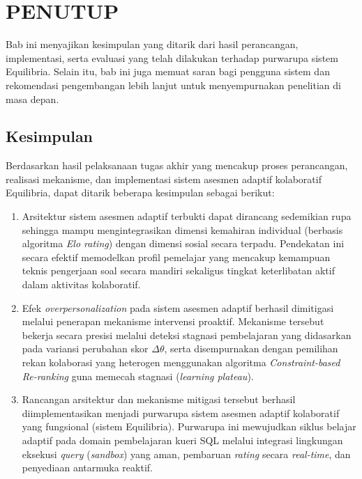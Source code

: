 \cleardoublepage
\chapter{PENUTUP}
\label{chap:penutup}

Bab ini menyajikan kesimpulan yang ditarik dari hasil perancangan, implementasi, serta evaluasi yang telah dilakukan terhadap purwarupa sistem Equilibria. Selain itu, bab ini juga memuat saran bagi pengguna sistem dan rekomendasi pengembangan lebih lanjut untuk menyempurnakan penelitian di masa depan.

\section{Kesimpulan}
\label{sec:kesimpulan}

Berdasarkan hasil pelaksanaan tugas akhir yang mencakup proses perancangan, realisasi
mekanisme, dan implementasi sistem asesmen adaptif kolaboratif Equilibria, dapat
ditarik beberapa kesimpulan sebagai berikut:
\begin{enumerate}
    \item Arsitektur sistem asesmen adaptif terbukti dapat dirancang sedemikian rupa sehingga mampu mengintegrasikan dimensi kemahiran individual (berbasis algoritma \textit{Elo rating}) dengan dimensi sosial secara terpadu. Pendekatan ini secara efektif memodelkan profil pemelajar yang mencakup kemampuan teknis pengerjaan soal secara mandiri sekaligus tingkat keterlibatan aktif dalam aktivitas kolaboratif.

    \item Efek \textit{overpersonalization} pada sistem asesmen adaptif berhasil dimitigasi melalui penerapan mekanisme intervensi proaktif. Mekanisme tersebut bekerja secara presisi melalui deteksi stagnasi pembelajaran yang didasarkan pada variansi perubahan skor $\Delta\theta$, serta disempurnakan dengan pemilihan rekan kolaborasi yang heterogen menggunakan algoritma \textit{Constraint-based Re-ranking} guna memecah stagnasi (\textit{learning plateau}).

    \item Rancangan arsitektur dan mekanisme mitigasi tersebut berhasil diimplementasikan menjadi purwarupa sistem asesmen adaptif kolaboratif yang fungsional (sistem Equilibria). Purwarupa ini mewujudkan siklus belajar adaptif pada domain pembelajaran kueri SQL melalui integrasi lingkungan eksekusi \textit{query} (\textit{sandbox}) yang aman, pembaruan \textit{rating} secara \textit{real-time}, dan penyediaan antarmuka reaktif.
\end{enumerate}

